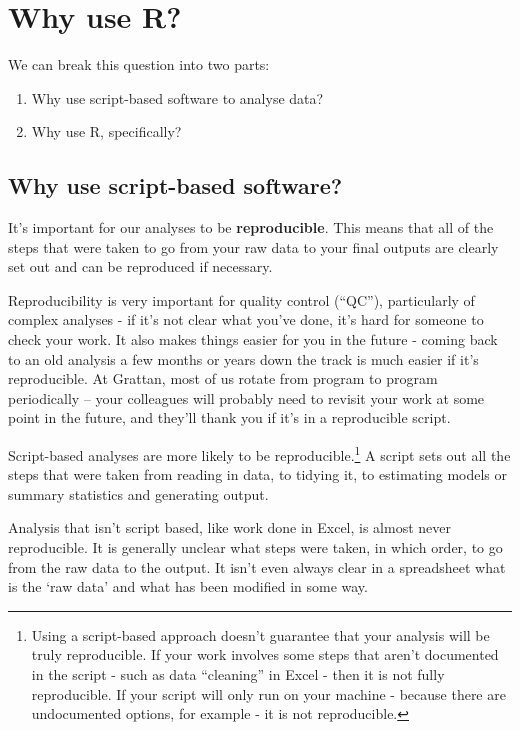\documentclass[
]{book}
\providecommand{\tightlist}{%
  \setlength{\itemsep}{0pt}\setlength{\parskip}{0pt}}
\begin{document}
\hypertarget{why-use-r}{%
\chapter{Why use R?}\label{why-use-r}}

We can break this question into two parts:

\begin{enumerate}
\def\labelenumi{\arabic{enumi}.}
\tightlist
\item
  Why use script-based software to analyse data?
\item
  Why use R, specifically?
\end{enumerate}

\hypertarget{why-script}{%
\section{Why use script-based software?}\label{why-script}}

It's important for our analyses to be \textbf{reproducible}. This means that all of the steps that were taken to go from your raw data to your final outputs are clearly set out and can be reproduced if necessary.

Reproducibility is very important for quality control (``QC''), particularly of complex analyses - if it's not clear what you've done, it's hard for someone to check your work. It also makes things easier for you in the future - coming back to an old analysis a few months or years down the track is much easier if it's reproducible. At Grattan, most of us rotate from program to program periodically -- your colleagues will probably need to revisit your work at some point in the future, and they'll thank you if it's in a reproducible script.

Script-based analyses are more likely to be reproducible.\footnote{Using a script-based approach doesn't guarantee that your analysis will be truly reproducible. If your work involves some steps that aren't documented in the script - such as data ``cleaning'' in Excel - then it is not fully reproducible. If your script will only run on your machine - because there are undocumented options, for example - it is not reproducible.} A script sets out all the steps that were taken from reading in data, to tidying it, to estimating models or summary statistics and generating output.

Analysis that isn't script based, like work done in Excel, is almost never reproducible. It is generally unclear what steps were taken, in which order, to go from the raw data to the output. It isn't even always clear in a spreadsheet what is the `raw data' and what has been modified in some way.
\end{document}
